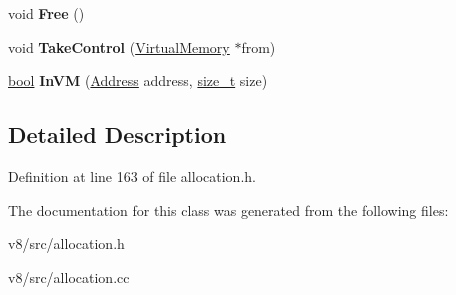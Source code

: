 \begin{DoxyCompactItemize}
\item 
\mbox{\label{classv8_1_1internal_1_1VirtualMemory_aa4fb97fe4e7e8e388986c1a8b55da893}} 
void {\bfseries Free} ()
\item 
\mbox{\label{classv8_1_1internal_1_1VirtualMemory_ad1b618904a13169cb168de8a31b5ce70}} 
void {\bfseries Take\+Control} (\mbox{\hyperlink{classv8_1_1internal_1_1VirtualMemory}{Virtual\+Memory}} $\ast$from)
\item 
\mbox{\label{classv8_1_1internal_1_1VirtualMemory_aa042bf38c14b45e6750c932036afcb0f}} 
\mbox{\hyperlink{classbool}{bool}} {\bfseries In\+VM} (\mbox{\hyperlink{classuintptr__t}{Address}} address, \mbox{\hyperlink{classsize__t}{size\+\_\+t}} size)
\end{DoxyCompactItemize}


\subsection{Detailed Description}


Definition at line 163 of file allocation.\+h.



The documentation for this class was generated from the following files\+:\begin{DoxyCompactItemize}
\item 
v8/src/allocation.\+h\item 
v8/src/allocation.\+cc\end{DoxyCompactItemize}

